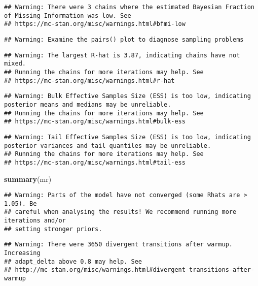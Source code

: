 \documentclass[
]{article}
\newenvironment{Shaded}{\begin{snugshade}}{\end{snugshade}}
\newcommand{\FunctionTok}[1]{\textcolor[rgb]{0.13,0.29,0.53}{\textbf{#1}}}
\newcommand{\NormalTok}[1]{#1}
\begin{document}
\begin{verbatim}
## Warning: There were 3 chains where the estimated Bayesian Fraction of Missing Information was low. See
## https://mc-stan.org/misc/warnings.html#bfmi-low
\end{verbatim}

\begin{verbatim}
## Warning: Examine the pairs() plot to diagnose sampling problems
\end{verbatim}

\begin{verbatim}
## Warning: The largest R-hat is 3.87, indicating chains have not mixed.
## Running the chains for more iterations may help. See
## https://mc-stan.org/misc/warnings.html#r-hat
\end{verbatim}

\begin{verbatim}
## Warning: Bulk Effective Samples Size (ESS) is too low, indicating posterior means and medians may be unreliable.
## Running the chains for more iterations may help. See
## https://mc-stan.org/misc/warnings.html#bulk-ess
\end{verbatim}

\begin{verbatim}
## Warning: Tail Effective Samples Size (ESS) is too low, indicating posterior variances and tail quantiles may be unreliable.
## Running the chains for more iterations may help. See
## https://mc-stan.org/misc/warnings.html#tail-ess
\end{verbatim}

\begin{Shaded}
\begin{Highlighting}[]
\FunctionTok{summary}\NormalTok{(mr)}
\end{Highlighting}
\end{Shaded}

\begin{verbatim}
## Warning: Parts of the model have not converged (some Rhats are > 1.05). Be
## careful when analysing the results! We recommend running more iterations and/or
## setting stronger priors.
\end{verbatim}

\begin{verbatim}
## Warning: There were 3650 divergent transitions after warmup. Increasing
## adapt_delta above 0.8 may help. See
## http://mc-stan.org/misc/warnings.html#divergent-transitions-after-warmup
\end{verbatim}
\end{document}
